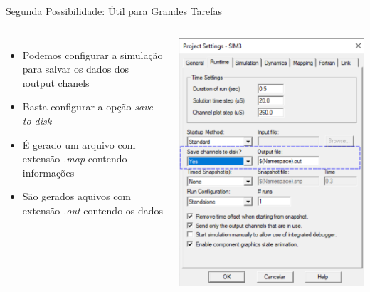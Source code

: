 \begin{frame}{Segunda Possibilidade: Útil para Grandes Tarefas}
\centering


\begin{columns}

\begin{itemize}
\item Podemos configurar a simulação para salvar os dados dos {\i output chanels}
\vspace*{0.5cm}
\item Basta configurar a opção {\it save to disk}
\vspace*{0.5cm}
\item É gerado um arquivo com extensão {\color{blue}\it .map} contendo informações
\vspace*{0.5cm}
\item São gerados aquivos com extensão {\color{blue}\it .out} contendo os dados
\end{itemize}

\centering
\includegraphics[width=0.70\linewidth]{./figuras/Exportacao/Export2}

\end{columns}


\end{frame}







